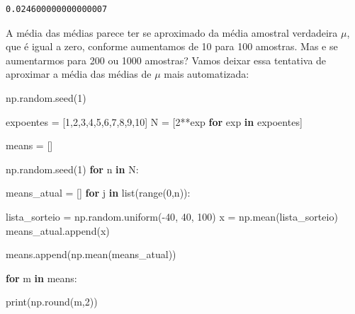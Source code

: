 \documentclass[
  brazilian,
  letterpaper,
  DIV=11,
  numbers=noendperiod]{scrreprt}
\newenvironment{Shaded}{\begin{snugshade}}{\end{snugshade}}
\newcommand{\BuiltInTok}[1]{\textcolor[rgb]{0.00,0.23,0.31}{#1}}
\newcommand{\ControlFlowTok}[1]{\textcolor[rgb]{0.00,0.23,0.31}{\textbf{#1}}}
\newcommand{\DecValTok}[1]{\textcolor[rgb]{0.68,0.00,0.00}{#1}}
\newcommand{\KeywordTok}[1]{\textcolor[rgb]{0.00,0.23,0.31}{\textbf{#1}}}
\newcommand{\NormalTok}[1]{\textcolor[rgb]{0.00,0.23,0.31}{#1}}
\newcommand{\OperatorTok}[1]{\textcolor[rgb]{0.37,0.37,0.37}{#1}}
\begin{document}
\begin{verbatim}
0.024600000000000007
\end{verbatim}

A média das médias parece ter se aproximado da média amostral verdadeira
\(\mu\), que é igual a zero, conforme aumentamos de 10 para 100
amostras. Mas e se aumentarmos para 200 ou 1000 amostras? Vamos deixar
essa tentativa de aproximar a média das médias de \(\mu\) mais
automatizada:

\begin{Shaded}
\begin{Highlighting}[]
\NormalTok{np.random.seed(}\DecValTok{1}\NormalTok{)}

\NormalTok{expoentes }\OperatorTok{=}\NormalTok{ [}\DecValTok{1}\NormalTok{,}\DecValTok{2}\NormalTok{,}\DecValTok{3}\NormalTok{,}\DecValTok{4}\NormalTok{,}\DecValTok{5}\NormalTok{,}\DecValTok{6}\NormalTok{,}\DecValTok{7}\NormalTok{,}\DecValTok{8}\NormalTok{,}\DecValTok{9}\NormalTok{,}\DecValTok{10}\NormalTok{]}
\NormalTok{N }\OperatorTok{=}\NormalTok{ [}\DecValTok{2}\OperatorTok{**}\NormalTok{exp }\ControlFlowTok{for}\NormalTok{ exp }\KeywordTok{in}\NormalTok{ expoentes]}

\NormalTok{means }\OperatorTok{=}\NormalTok{ [] }

\NormalTok{np.random.seed(}\DecValTok{1}\NormalTok{)}
\ControlFlowTok{for}\NormalTok{ n }\KeywordTok{in}\NormalTok{ N:}
    
\NormalTok{    means\_atual }\OperatorTok{=}\NormalTok{ [] }
    \ControlFlowTok{for}\NormalTok{ j }\KeywordTok{in} \BuiltInTok{list}\NormalTok{(}\BuiltInTok{range}\NormalTok{(}\DecValTok{0}\NormalTok{,n)):}
        
\NormalTok{        lista\_sorteio }\OperatorTok{=}\NormalTok{ np.random.uniform(}\OperatorTok{{-}}\DecValTok{40}\NormalTok{, }\DecValTok{40}\NormalTok{, }\DecValTok{100}\NormalTok{)}
\NormalTok{        x }\OperatorTok{=}\NormalTok{ np.mean(lista\_sorteio)}
\NormalTok{        means\_atual.append(x)}
        
\NormalTok{    means.append(np.mean(means\_atual))}
\end{Highlighting}
\end{Shaded}

\begin{Shaded}
\begin{Highlighting}[]
\ControlFlowTok{for}\NormalTok{ m }\KeywordTok{in}\NormalTok{ means:}
    
    \BuiltInTok{print}\NormalTok{(np.}\BuiltInTok{round}\NormalTok{(m,}\DecValTok{2}\NormalTok{))}
\end{Highlighting}
\end{Shaded}
\end{document}
